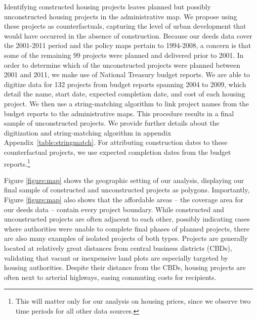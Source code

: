 \documentclass[12pt]{article}
\begin{document}
Identifying constructed housing projects leaves planned but possibly unconstructed housing projects in the administrative map.  We propose using these projects as counterfactuals, capturing the level of urban development that would have occurred in the absence of construction. Because our deeds data cover the 2001-2011 period and the policy maps pertain to 1994-2008, a concern is that some of the remaining 99 projects were planned and delivered prior to 2001. In order to determine which of the unconstructed projects were planned between 2001 and 2011, we make use of National Treasury budget reports.  We are able to digitize data for 132 projects from budget reports spanning 2004 to 2009, which detail the name, start date, expected completion date, and cost of each housing project.  We then use a string-matching algorithm to link project names from the budget reports to the administrative maps. This procedure results in a final sample of unconstructed projects. We provide further details about the digitization and string-matching algorithm in appendix Appendix~\ref{table:stringmatch}. For attributing construction dates to these counterfactual projects,  we use expected completion dates from the budget reports.\footnote{This will matter only for our analysis on housing prices, since we observe two time periods for all other data sources. }

Figure \ref{figure:map} shows the geographic setting of our analysis, displaying our final sample of constructed and unconstructed projects as polygons. Importantly, Figure \ref{figure:map} also shows that the affordable areas -- the coverage area for our deeds data -- contain every project boundary. While constructed and unconstructed projects are often adjacent to each other, possibly indicating cases where authorities were unable to complete final phases of planned projects, there are also many examples of isolated projects of both types.  Projects are generally located at relatively great distances from central business districts (CBDs), validating that vacant or inexpensive land plots are especially targeted by housing authorities.  Despite their distance from the CBDs, housing projects are often next to arterial highways, easing commuting costs for recipients.
\end{document}
